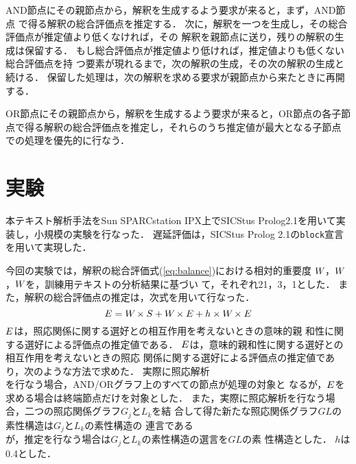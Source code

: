 AND節点にその親節点から，解釈を生成するよう要求が来ると，まず，AND節点
で得る解釈の総合評価点を推定する．
次に，解釈を一つを生成し，その総合評価点が推定値より低くなければ，その
解釈を親節点に送り，残りの解釈の生成は保留する．
もし総合評価点が推定値より低ければ，推定値よりも低くない総合評価点を持
つ要素が現れるまで，次の解釈の生成，その次の解釈の生成と続ける．
保留した処理は，次の解釈を求める要求が親節点から来たときに再開する．

OR節点にその親節点から，解釈を生成するよう要求が来ると，OR節点の各子節
点で得る解釈の総合評価点を推定し，それらのうち推定値が最大となる子節点
での処理を優先的に行なう．

\section{実験}
\label{sec:experiment}

本テキスト解析手法をSun SPARCstation IPX上でSICStus Prolog2.1を用いて実
装し，小規模の実験を行なった．
遅延評価は，SICStus Prolog 2.1の{\tt block}宣言を用いて実現した．

今回の実験では，解釈の総合評価式(\ref{eq:balance})における相対的重要度
$W_{}$，$W_{}$，$W_{}$を，訓練用テキストの分析結果に基づい
て，それぞれ21，3，1とした．
また，解釈の総合評価点の推定は，次式を用いて行なった．
\[ E = W_{} \times S_{} + W_{} \times E_{} + h \times
W_{} \times E_{} \]
$E_{}$は，照応関係に関する選好との相互作用を考えないときの意味的親
和性に関する選好による評価点の推定値である．
$E_{}$は，意味的親和性に関する選好との相互作用を考えないときの照応
関係に関する選好による評価点の推定値であり，次のような方法で求めた．
実際に照応解析\\を行なう場合，AND/ORグラフ上のすべての節点が処理の対象と
なるが，$E_{}$を求める場合は終端節点だけを対象とした．
また，実際に照応解析を行なう場合，二つの照応関係グラフ$G_j$と$L_k$を結
合して得た新たな照応関係グラフ$GL$の素性構造は$G_j$\hspace*{-0.1mm}と\hspace*{-0.1mm}$L_k$の素性構造の
連言である\\が，推定を行なう場合は$G_j$と$L_k$の素性構造の選言を$GL$の素
性構造とした．
$h$は0.4とした．

